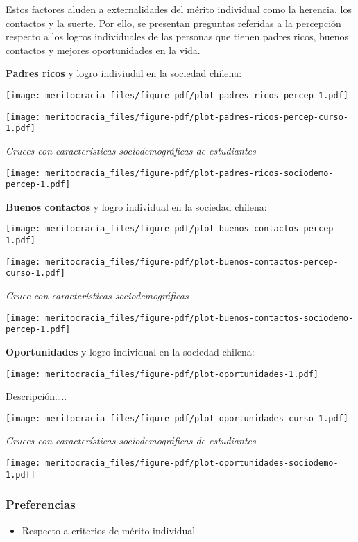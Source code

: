 \documentclass[
  letterpaper,
  DIV=11,
  numbers=noendperiod]{scrreprt}
\providecommand{\tightlist}{%
  \setlength{\itemsep}{0pt}\setlength{\parskip}{0pt}}\usepackage{longtable,booktabs,array}
\begin{document}
Estos factores aluden a externalidades del mérito individual como la
herencia, los contactos y la suerte. Por ello, se presentan preguntas
referidas a la percepción respecto a los logros individuales de las
personas que tienen padres ricos, buenos contactos y mejores
oportunidades en la vida.

\textbf{Padres ricos} y logro indiviudal en la sociedad chilena:

\texttt{[image: meritocracia\_files/figure-pdf/plot-padres-ricos-percep-1.pdf]}

\texttt{[image: meritocracia\_files/figure-pdf/plot-padres-ricos-percep-curso-1.pdf]}

\emph{Cruces con características sociodemográficas de estudiantes}

\texttt{[image: meritocracia\_files/figure-pdf/plot-padres-ricos-sociodemo-percep-1.pdf]}

\textbf{Buenos contactos} y logro individual en la sociedad chilena:

\texttt{[image: meritocracia\_files/figure-pdf/plot-buenos-contactos-percep-1.pdf]}

\texttt{[image: meritocracia\_files/figure-pdf/plot-buenos-contactos-percep-curso-1.pdf]}

\emph{Cruce con características sociodemográficas}

\texttt{[image: meritocracia\_files/figure-pdf/plot-buenos-contactos-sociodemo-percep-1.pdf]}

\textbf{Oportunidades} y logro individual en la sociedad chilena:

\texttt{[image: meritocracia\_files/figure-pdf/plot-oportunidades-1.pdf]}

Descripción\ldots..

\texttt{[image: meritocracia\_files/figure-pdf/plot-oportunidades-curso-1.pdf]}

\emph{Cruces con características sociodemográficas de estudiantes}

\texttt{[image: meritocracia\_files/figure-pdf/plot-oportunidades-sociodemo-1.pdf]}

\subsubsection{Preferencias}\label{preferencias}

\begin{itemize}
\tightlist
\item
  Respecto a criterios de mérito individual
\end{itemize}
\end{document}
